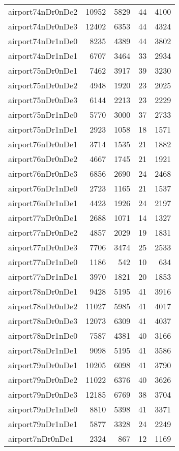 \begin{longtable}{lrrrr}
airport74nDr0nDe2 & 10952 & 5829 & 44 & 4100 \\
airport74nDr0nDe3 & 12402 & 6353 & 44 & 4324 \\
airport74nDr1nDe0 & 8235 & 4389 & 44 & 3802 \\
airport74nDr1nDe1 & 6707 & 3464 & 33 & 2934 \\
airport75nDr0nDe1 & 7462 & 3917 & 39 & 3230 \\
airport75nDr0nDe2 & 4948 & 1920 & 23 & 2025 \\
airport75nDr0nDe3 & 6144 & 2213 & 23 & 2229 \\
airport75nDr1nDe0 & 5770 & 3000 & 37 & 2733 \\
airport75nDr1nDe1 & 2923 & 1058 & 18 & 1571 \\
airport76nDr0nDe1 & 3714 & 1535 & 21 & 1882 \\
airport76nDr0nDe2 & 4667 & 1745 & 21 & 1921 \\
airport76nDr0nDe3 & 6856 & 2690 & 24 & 2468 \\
airport76nDr1nDe0 & 2723 & 1165 & 21 & 1537 \\
airport76nDr1nDe1 & 4423 & 1926 & 24 & 2197 \\
airport77nDr0nDe1 & 2688 & 1071 & 14 & 1327 \\
airport77nDr0nDe2 & 4857 & 2029 & 19 & 1831 \\
airport77nDr0nDe3 & 7706 & 3474 & 25 & 2533 \\
airport77nDr1nDe0 & 1186 & 542 & 10 & 634 \\
airport77nDr1nDe1 & 3970 & 1821 & 20 & 1853 \\
airport78nDr0nDe1 & 9428 & 5195 & 41 & 3916 \\
airport78nDr0nDe2 & 11027 & 5985 & 41 & 4017 \\
airport78nDr0nDe3 & 12073 & 6309 & 41 & 4037 \\
airport78nDr1nDe0 & 7587 & 4381 & 40 & 3166 \\
airport78nDr1nDe1 & 9098 & 5195 & 41 & 3586 \\
airport79nDr0nDe1 & 10205 & 6098 & 41 & 3790 \\
airport79nDr0nDe2 & 11022 & 6376 & 40 & 3626 \\
airport79nDr0nDe3 & 12185 & 6769 & 38 & 3704 \\
airport79nDr1nDe0 & 8810 & 5398 & 41 & 3371 \\
airport79nDr1nDe1 & 5877 & 3328 & 24 & 2249 \\
airport7nDr0nDe1 & 2324 & 867 & 12 & 1169 \\

\end{longtable}
